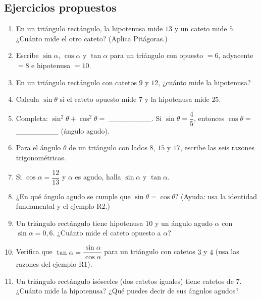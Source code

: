 \documentclass[12pt, letterpaper]{article}
\providecommand{\sen}{\sin}
\begin{document}
\newpage %

\subsection{Ejercicios propuestos}

\begin{enumerate}[leftmargin=*, resume]
  \item \facil{} En un triángulo rectángulo, la hipotenusa mide $13$ y un cateto mide $5$. ¿Cuánto mide el otro cateto? (Aplica Pitágoras.)

  \item \facil{} Escribe $\sen \alpha$, $\cos \alpha$ y $\tan \alpha$ para un triángulo con opuesto $= 6$, adyacente $= 8$ e hipotenusa $= 10$.

  \item \facil{} En un triángulo rectángulo con catetos $9$ y $12$, ¿cuánto mide la hipotenusa?

  \item \facil{} Calcula $\sen \theta$ si el cateto opuesto mide $7$ y la hipotenusa mide $25$.

  \item \facil{} Completa: $\sen^2 \theta + \cos^2 \theta =$ \_\_\_\_\_\_\_\_. Si $\sen \theta = \dfrac{4}{5}$, entonces $\cos \theta =$ \_\_\_\_\_\_\_\_ (ángulo agudo).

  \item \medio{} Para el ángulo $\theta$ de un triángulo con lados $8$, $15$ y $17$, escribe las seis razones trigonométricas.

  \item \medio{} Si $\cos \alpha = \dfrac{12}{13}$ y $\alpha$ es agudo, halla $\sen \alpha$ y $\tan \alpha$.

  \item \medio{} ¿En qué ángulo agudo se cumple que $\sen \theta = \cos \theta$? (Ayuda: usa la identidad fundamental y el ejemplo R2.)

  \item \medio{} Un triángulo rectángulo tiene hipotenusa $10$ y un ángulo agudo $\alpha$ con $\sen \alpha = 0{,}6$. ¿Cuánto mide el cateto opuesto a $\alpha$?

  \item \dificil{} Verifica que $\tan \alpha = \dfrac{\sen \alpha}{\cos \alpha}$ para un triángulo con catetos $3$ y $4$ (usa las razones del ejemplo R1).

  \item \dificil{} Un triángulo rectángulo isósceles (dos catetos iguales) tiene catetos de $7$. ¿Cuánto mide la hipotenusa? ¿Qué puedes decir de sus ángulos agudos?
\end{enumerate}
\end{document}
